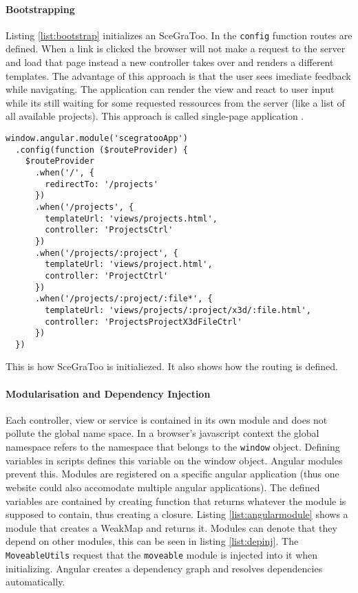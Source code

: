 \paragraph{Bootstrapping}
\label{par:Bootstrapping and Routing}

Listing \ref{list:bootstrap} initializes an SceGraToo. In the \texttt{config}
function routes are defined. When a link is clicked the browser will not make a
request to the server and load that page instead a new controller takes over and
renders a different templates. The advantage of this approach is that the user
sees imediate feedback while navigating. The application can render the view and
react to user input while its still waiting for some requested ressources from
the server (like a list of all available projects). This approach is called
single-page application \cite{Mikowski:2013:SPW:2663433}.

\begin{listing}
  \begin{verbatim}
window.angular.module('scegratooApp')
  .config(function ($routeProvider) {
    $routeProvider
      .when('/', {
        redirectTo: '/projects'
      })
      .when('/projects', {
        templateUrl: 'views/projects.html',
        controller: 'ProjectsCtrl'
      })
      .when('/projects/:project', {
        templateUrl: 'views/project.html',
        controller: 'ProjectCtrl'
      })
      .when('/projects/:project/:file*', {
        templateUrl: 'views/projects/:project/x3d/:file.html',
        controller: 'ProjectsProjectX3dFileCtrl'
      })
  })
  \end{verbatim}
  \caption{This is how SceGraToo is initialiezed. It also shows how the routing is defined.}
  \label{list:bootstrap}
\end{listing}

\paragraph{Modularisation and Dependency Injection}
\label{par:modularisation}

Each controller, view or service is contained in its own module and does not
pollute the global name space. In a browser's javascript context the global
namespace refers to the namespace that belongs to the \texttt{window} object.
Defining variables in scripts defines this variable on the window object.
Angular modules prevent this. Modules are registered on a specific angular
application (thus one website could also accomodate multiple angular
applications). The defined variables are contained by creating function that
returns whatever the module is supposed to contain, thus creating a closure.
Listing \ref{list:angularmodule} shows a module that creates a WeakMap and
returns it. Modules can denote that they depend on other modules, this can be
seen in listing \ref{list:depinj}. The \texttt{MoveableUtils} request that the
\texttt{moveable} module is injected into it when initializing. Angular creates
a dependency graph and resolves dependencies automatically.


